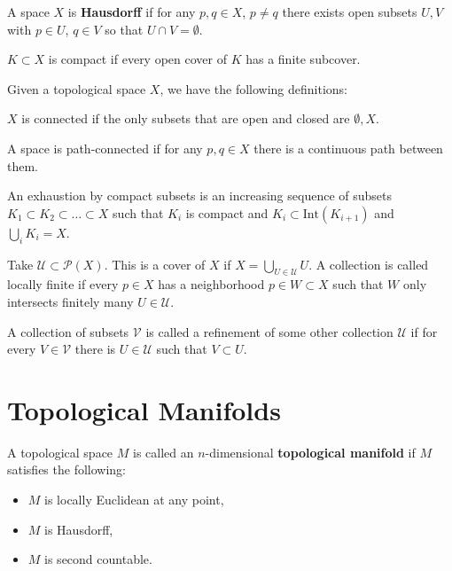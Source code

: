 \documentclass[12pt]{scrartcl}
\let \mc \mathcal
\begin{document}
\begin{definition} A space $X$ is \textbf{Hausdorff} if for any $p, q \in X$, $p \ne q$ there exists open subsets $U, V$ with $p \in U$, $q \in V$ so that $U \cap V = \emptyset$.
\end{definition}

\begin{definition} $K \subset X$ is compact if every open cover of $K$ has a finite subcover.  
\end{definition}

Given a topological space $X$, we have the following definitions:
\begin{definition} $X$ is connected if the only subsets that are open and closed are $\emptyset, X$.
\end{definition}
\begin{definition} A space is path-connected if for any $p, q \in X$ there is a continuous path between them.  
\end{definition}

\begin{definition} An exhaustion by compact subsets is an increasing sequence of subsets $K_1 \subset K_2 \subset \dots \subset X$ such that $K_i$ is compact and $K_i \subset \text{Int}(K_{i+1})$ and $\bigcup_i K_i = X$.
\end{definition}

\begin{definition} Take $\mc U \subset \mc P(X)$.  This is a cover of $X$ if $X = \bigcup_{U \in \mc U} U$.  A collection is called locally finite if every $p \in X$ has a neighborhood $p \in W \subset X$ such that $W$ only intersects finitely many $U \in \mc U$.    
\end{definition}


\begin{definition} A collection of subsets $\mc V$ is called a refinement of some other collection $\mc U$ if for every $V \in \mc V$ there is $U \in \mc U$ such that $V \subset U$.  
\end{definition}
\section{Topological Manifolds}
\begin{definition} A topological space $M$ is called an $n$-dimensional \textbf{topological manifold} if $M$ satisfies the following:
\begin{itemize}
\item $M$ is locally Euclidean at any point,
\item $M$ is Hausdorff,
\item $M$ is second countable.
\end{itemize}
\end{definition}
\end{document}
